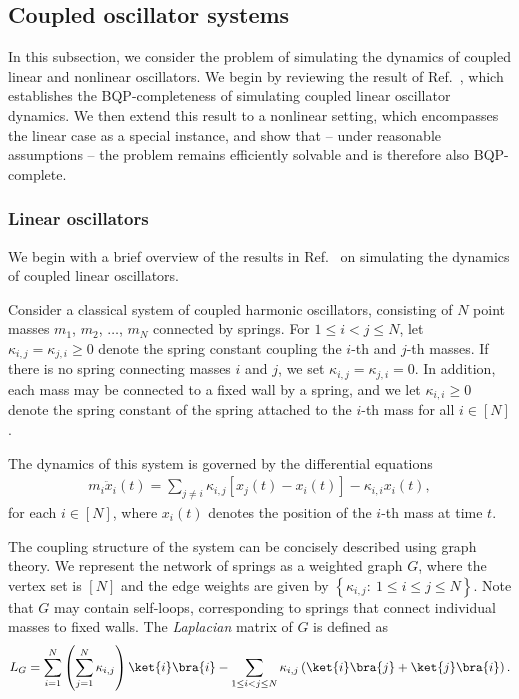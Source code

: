\documentclass[superscriptaddress,onecolumn,nofootinbib,longbibliography,a4paper,accepted=2026-09-29]{quantumarticle}
\theoremstyle{plain}
\theoremstyle{definition}
\numberwithin{thm}{section}
\numberwithin{assumption}{section}
\numberwithin{lemma}{section}
\numberwithin{prop}{section}
\numberwithin{cor}{section}
\numberwithin{definition}{section}
\numberwithin{rmk}{section}
\numberwithin{equation}{section}
\newcommand{\lrb}[1]{\left ( #1 \right )}
\newcommand{\lrcb}[1]{\left \{ #1 \right \}}
\begin{document}
\subsection{Coupled oscillator systems}
\label{subsec:coupled_oscillators}

In this subsection, we consider the problem of simulating the dynamics of coupled linear and nonlinear oscillators. We begin by reviewing the result of Ref.~\cite{babbush2023exponential}, which establishes the BQP-completeness of simulating coupled linear oscillator dynamics. We then extend this result to a nonlinear setting, which encompasses the linear case as a special instance, and show that -- under reasonable assumptions -- the problem remains efficiently solvable and is therefore also BQP-complete. 

\subsubsection{Linear oscillators}
\label{subsubsec:coupled_linear_oscillators}

We begin with a brief overview of the results in Ref.~\cite{babbush2023exponential} on simulating the dynamics of coupled linear oscillators.

Consider a classical system of coupled harmonic oscillators, consisting of \( N \) point masses $m_1$, $m_2$, $\dots$, $m_N$ connected by springs. For \( 1 \le i < j \le N \), let \( \kappa_{i,j} = \kappa_{j,i} \ge 0 \) denote the spring constant coupling the \( i \)-th and \( j \)-th masses. If there is no spring connecting masses \( i \) and \( j \), we set \( \kappa_{i,j} = \kappa_{j,i} = 0 \). In addition, each mass may be connected to a fixed wall by a spring, and we let \( \kappa_{i,i} \ge 0 \) denote the spring constant of the spring attached to the \( i \)-th mass for all \( i \in [N] \).

The dynamics of this system is governed by the differential  equations
\begin{align}
m_i \ddot{x}_i(t) = \sum_{j \ne i} \kappa_{i,j} \left[ x_j(t) - x_i(t) \right] - \kappa_{i,i} x_i(t),    
\end{align}
for each \( i \in [N] \), where \( x_i(t) \) denotes the position of the \( i \)-th mass at time \( t \). 

The coupling structure of the system can be concisely described using graph theory. We represent the network of springs as a weighted graph $G$, where the vertex set is $[N]$ and the edge weights are given by $\lrcb{\kappa_{i,j}:~1\le i\le j\le N}$. Note that $G$ may contain self-loops, corresponding to springs that connect individual masses to fixed walls. The \emph{Laplacian} matrix of $G$ is defined as
\begin{align}
L_G = \sum_{i=1}^N \lrb{\sum_{j=1}^N \kappa_{i,j}} \ket{i}\bra{i} - \sum_{1\le i<j\le N} \kappa_{i,j} \lrb{\ket{i}\bra{j}+\ket{j}\bra{i}}.
\label{eq:laplacian_matrix_def}
\end{align}
\end{document}
